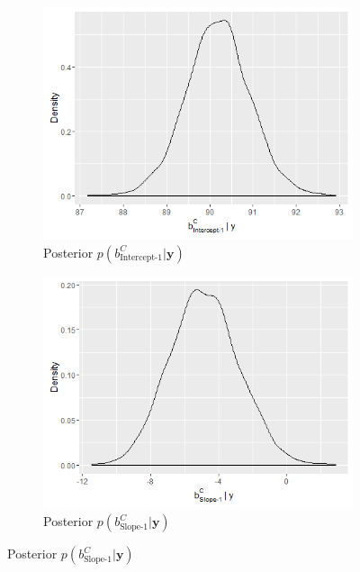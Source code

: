 \begin{figure}[!htb]
\centering
\captionsetup{justification=centering}
\begin{subfigure}[b]{0.4\textwidth}
		\includegraphics[width=\textwidth]{mainmatter/chapter_6_blood_donor/b11.png}
        \caption{\label{fig : mu_blood_donor_11}Posterior $p(b_\text{Intercept-1}^C|\boldsymbol{y})$}
	\end{subfigure}
	\begin{subfigure}[b]{0.4\textwidth}
		\includegraphics[width=\textwidth]{mainmatter/chapter_6_blood_donor/b12.png}	
          \caption{\label{fig : mu_blood_donor_12}Posterior $p(b_\text{Slope-1}^C|\boldsymbol{y})$}
	\end{subfigure}

\end{figure}

